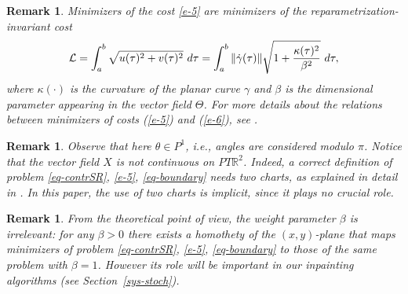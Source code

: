 \documentclass[proc]{edpsmath}
\newcommand{\R}{\mathbb{R}}
\newcommand{\PTR}{PT\R^2}
\newcommand{\bqn}{\begin{eqnarray}}
\newcommand{\Pt}[1]{\left( #1 \right)}
\newcommand{\nn}{\nonumber}
\newcommand{\ba}[1]{\begin{array}{#1}}
\newcommand{\ea}{\end{array}}
\renewcommand{\th}{\theta}
\newcommand{\eqnn}{\nonumber\end{eqnarray}}
\newcommand{\eqnl}[1]{\label{#1}\end{eqnarray}}
\newcommand{\ul}[1]{{\mathbf #1}}
\newcommand{\bd}{\begin{description}}
\newcommand{\ed}{\end{description}}
\newcommand{\pprojective}{${\bf (P_{projective})}$}
\newtheorem{remark}[theorem]{Remark}
\newcommand{\brem}{\begin{remark}}
\newcommand{\erem}{\end{remark}}
\renewcommand{\r}[1]{(\ref{#1})}
\begin{document}
\brem
 Minimizers of the cost  \eqref{e-5} are minimizers of the reparametrization-invariant cost
\bqn
{\cal L}=\int_a^b \sqrt{ u(\tau)^2+v(\tau)^2}~d\tau=\int_a^b \|\dot{\gamma}(\tau)\| \sqrt{1+\frac{\kappa(\tau)^2}{\beta^2}}~d\tau, \label{e-7}
\eqnl{e-6}
where $\kappa(\cdot)$ is the curvature of the planar curve $\gamma$ and $\beta$ is the dimensional parameter appearing in the vector field $\Theta$. For more details about the relations between minimizers of costs \r{e-5} and \r{e-6}, see \cite{yuri1}.
\erem

\brem
Observe that here $\theta\in P^1$, i.e., angles are considered modulo $\pi$. Notice that the vector field $X$ is not continuous on $\PTR$. Indeed, a correct definition of problem \eqref{eq-contrSR}, \eqref{e-5}, \eqref{eq-boundary}  needs two charts, as explained in detail in \cite[Remark~12]{Boscain2012a}. In this paper, the use of two charts is implicit, since it plays no crucial role.
\erem
\begin{remark}
\label{remALFA}
From the theoretical point of view, the weight parameter $\beta$ is irrelevant: for any $\beta >0$ there exists a homothety of the $(x,y)$-plane that maps minimizers of problem \eqref{eq-contrSR}, \eqref{e-5}, \eqref{eq-boundary} to those of the same problem with $\beta=1$. However its role will be important in our inpainting algorithms (see Section~\ref{sys-stoch}).
\end{remark}
\end{document}

